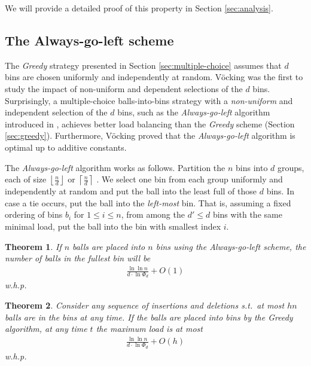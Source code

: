 \documentclass[a4paper,12pt]{article}
\newtheorem{theorem}{Theorem}
\begin{document}
We will provide a detailed proof of this property in Section \ref{sec:analysis}.

\subsection{The Always-go-left scheme}
\label{sec:AlwaysGoLeft}
The \emph{Greedy} strategy presented in Section \ref{sec:multiple-choice} assumes that $d$ bins are chosen uniformly and independently at random. V\"ocking \cite{VOC03} was the first to study the impact of non-uniform and dependent selections of the $d$ bins. Surprisingly, a multiple-choice balls-into-bins strategy with a \emph{non-uniform} and independent selection of the $d$ bins, such as the \emph{Always-go-left} algorithm introduced in \cite{VOC03}, achieves better \cite{BCSV06} load balancing than the \emph{Greedy} scheme (Section \ref{sec:greedy}). Furthermore, V\"ocking proved that the \emph{Always-go-left} algorithm is optimal up to additive constants.

The \emph{Always-go-left} algorithm works as follows. Partition the $n$ bins into $d$ groups, each of size $\left\lfloor \frac{n}{d}\right\rfloor$ or $\left\lceil\frac{n}{d}\right\rceil$ . We select one bin from each group uniformly and independently at random and put the ball into the least full of those $d$ bins. In case a tie occurs, put the ball into the \emph{left-most} bin. That is, assuming a fixed ordering of bins $b_i$ for $1 \leq i \leq n$, from among the $d' \leq d$ bins with the same minimal load, put the ball into the bin with smallest index $i$.

\begin{theorem}
\label{theorem:agln}
If $n$ balls are placed into $n$ bins using the Always-go-left scheme, the number of balls in the fullest bin will be 
\begin{align}
\frac{\ln\ln n}{d \cdot \ln \Phi_d} + O(1)
\end{align}
w.h.p.
\end{theorem}

\begin{theorem}
\label{theorem:algm}
Consider any sequence of insertions and deletions s.t.~at most $hn$ balls are in the bins at any time. If the balls are placed into bins by the Greedy algorithm, at any time $t$ the maximum load is at most 
\begin{align}
\frac{\ln\ln n}{d \cdot \ln \Phi_d} + O(h)
\end{align}
w.h.p.
\end{theorem}
\end{document}
